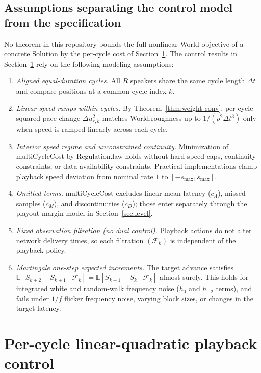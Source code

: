 \documentclass[11pt,a4paper]{article}
\DeclareRobustCommand{\lean}[1]{{\ttfamily\def\_{\textunderscore\allowbreak}#1}}
\newcommand{\E}{\mathbb{E}}
\theoremstyle{definition}
\begin{document}
\subsection{Assumptions separating the control model from the specification}

No theorem in this repository bounds the full nonlinear \lean{World} objective
of a concrete \lean{Solution} by the per-cycle cost of
Section~\ref{sec:control}. The control results in Section~\ref{sec:control}
rely on the following modeling assumptions:
\begin{enumerate}
\item \emph{Aligned equal-duration cycles.} All $R$ speakers share the same
  cycle length $\Delta t$ and compare positions at a common cycle index $k$.
\item \emph{Linear speed ramps within cycles.} By Theorem~\ref{thm:weight-conv},
  per-cycle squared pace change $\Delta u_{r,k}^2$ matches
  \lean{World.roughness} up to $1/(\rho^2\Delta t^3)$ only when speed is ramped
  linearly across each cycle.
\item \emph{Interior speed regime and unconstrained continuity.} Minimization of
  \lean{multiCycleCost} by \lean{Regulation.law} holds without hard speed caps,
  continuity constraints, or data-availability constraints. Practical
  implementations clamp playback speed deviation from nominal rate $1$ to
  $[-s_{\max}, s_{\max}]$.
\item \emph{Omitted terms.} \lean{multiCycleCost} excludes linear mean latency
  ($c_\Lambda$), missed samples ($c_M$), and discontinuities ($c_D$); those
  enter separately through the playout margin model in Section~\ref{sec:level}.
\item \emph{Fixed observation filtration (no dual control).} Playback actions
  do not alter network delivery times, so each filtration $(\mathcal{F}_k)$ is
  independent of the playback policy.
\item \emph{Martingale one-step expected increments.} The target advance
  satisfies $\E[S_{k+2} - S_{k+1} \mid \mathcal{F}_k] =
  \E[S_{k+1} - S_k \mid \mathcal{F}_k]$ almost surely. This holds for
  integrated white and random-walk frequency noise ($h_0$ and $h_{-2}$ terms),
  and fails under $1/f$ flicker frequency noise, varying block sizes, or changes
  in the target latency.
\end{enumerate}

\section{Per-cycle linear-quadratic playback control}
\label{sec:control}
\end{document}
